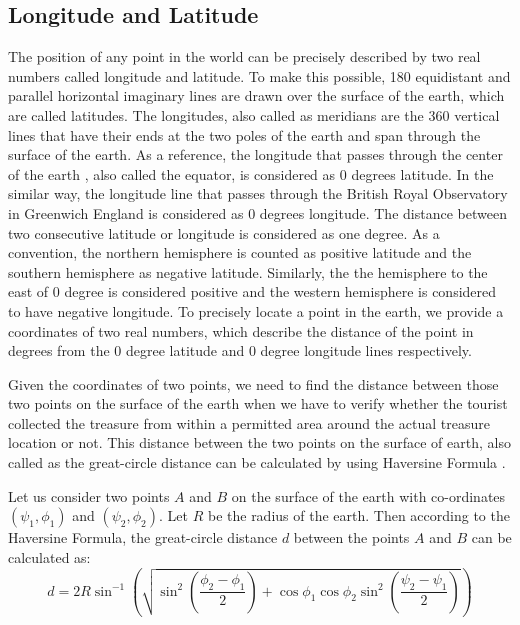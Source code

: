 \documentclass[12pt, a4paper, oneside]{article}
\begin{document}
\subsection{Longitude and Latitude} \label{latlng}
The position of any point in the world can be precisely described by two real numbers called longitude and latitude. To make this possible, 180 equidistant and parallel horizontal imaginary lines are drawn over the surface of the earth, which are called latitudes. The longitudes, also called as meridians are the 360 vertical lines that have their ends at the two poles of the earth and span through the surface of the earth. As a reference, the longitude that passes through the center of the earth , also called the equator, is considered as 0 degrees latitude. In the similar way, the longitude line that passes through the British Royal Observatory in Greenwich England is considered as 0 degrees longitude. The distance between two consecutive latitude or longitude is considered as one degree. As a convention, the northern hemisphere is counted as positive latitude and the southern hemisphere as negative latitude. Similarly, the the hemisphere to the east of 0 degree is considered positive and the western hemisphere is considered to have negative longitude. To precisely locate a point in the earth, we provide a coordinates of two real numbers, which describe the distance of the point in degrees from the 0 degree latitude and 0 degree longitude lines respectively.

Given the coordinates of two points, we need to find the distance between those two points on the surface of the earth when we have to verify whether the tourist collected the treasure from within a permitted area around the actual treasure location or not. This distance between the two points on the surface of earth, also called as the great-circle distance can be calculated by using Haversine Formula \cite{haversine}.

Let us consider two points $A$ and $B$ on the surface of the earth with co-ordinates $(\psi_1, \phi_1)$ and $(\psi_2, \phi_2)$. Let $R$ be the radius of the earth. Then according to the Haversine Formula, the great-circle distance $d$ between the points $A$ and $B$ can be calculated as:
\begin{equation}
 d = 2R \sin^{-1} \left( \sqrt { \sin^2 \left( \frac{\phi_2 - \phi_1}{2} \right) + \cos{\phi_1} \cos{\phi_2} \sin^2 \left( \frac{\psi_2 - \psi_1}{2} \right) } \right) 
 \label{eq:haversine}
\end{equation}
\end{document}
